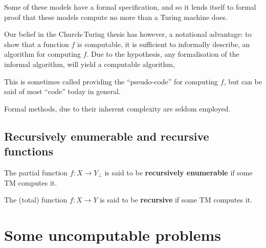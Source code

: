 Some of these models have a formal specification, and so it lends itself to
formal proof that these models compute no more than a Turing machine does.

Our belief in the Church-Turing thesis has however, a notational advantage: to
show that a function $f$ is computable, it is sufficient to informally
describe, an algorithm for computing $f$. Due to the hypothesis, any
formalisation of the informal algorithm, will yield a computable algorithm,

This is sometimes called providing the ``pseudo-code'' for computing $f$, but can be said
of most ``code'' today in general.

Formal methods, due to their inherent complexity are seldom employed.


\subsection{Recursively enumerable and recursive functions}

\begin{definition} The partial function $f:X\rightarrow Y_\bot$ is said to be
\textbf{recursively enumerable} if some TM computes it. \end{definition}

\begin{definition} The (total) function $f:X\rightarrow Y$ is said to be
\textbf{recursive} if some TM computes it. \end{definition}

\section{Some uncomputable problems}
